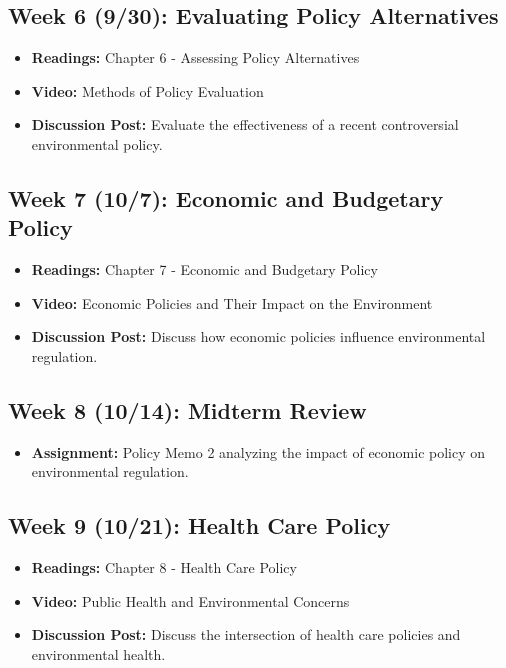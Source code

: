 \documentclass[12pt, letterpaper]{article}
\begin{document}
\subsection*{Week 6 (9/30): Evaluating Policy Alternatives}
\begin{itemize}
    \item \textbf{Readings:} Chapter 6 - Assessing Policy Alternatives
    \item \textbf{Video:} Methods of Policy Evaluation
    \item \textbf{Discussion Post:} Evaluate the effectiveness of a recent controversial environmental policy.
\end{itemize}

\subsection*{Week 7 (10/7): Economic and Budgetary Policy}
\begin{itemize}
    \item \textbf{Readings:} Chapter 7 - Economic and Budgetary Policy
    \item \textbf{Video:} Economic Policies and Their Impact on the Environment
    \item \textbf{Discussion Post:} Discuss how economic policies influence environmental regulation.
\end{itemize}

\subsection*{Week 8 (10/14): Midterm Review}
\begin{itemize}
    \item \textbf{Assignment:} Policy Memo 2 analyzing the impact of economic policy on environmental regulation.
\end{itemize}

\subsection*{Week 9 (10/21): Health Care Policy}
\begin{itemize}
    \item \textbf{Readings:} Chapter 8 - Health Care Policy
    \item \textbf{Video:} Public Health and Environmental Concerns
    \item \textbf{Discussion Post:} Discuss the intersection of health care policies and environmental health.
\end{itemize}
\end{document}
